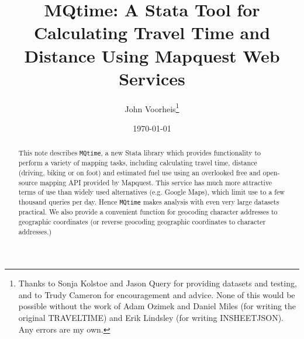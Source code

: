 \documentclass[12pt]{article}
\title{MQtime: A Stata Tool for Calculating Travel Time and Distance Using Mapquest Web Services}
\author{John Voorheis\thanks{Thanks to Sonja Kolstoe and Jason Query for providing datasets and testing, and to Trudy Cameron for encouragement and advice. None of this would be possible without the work of Adam Ozimek and Daniel Miles (for writing the original TRAVELTIME) and Erik Lindsley (for writing INSHEETJSON). Any errors are my own.}}
\affil{University of Oregon}
\date{\today}
\begin{document}
\maketitle

\begin{abstract}
This note describes  \verb|MQtime|, a new Stata library which provides functionality to perform a variety of mapping tasks, including calculating travel time, distance (driving, biking or on foot) and estimated fuel use using an overlooked free and open-source mapping API provided by Mapquest. This service has much more attractive terms of use than widely used alternatives (e.g. Google Maps), which limit use to a few thousand queries per day. Hence \verb|MQtime| makes analysis with even very large datasets practical. We also provide a convenient function for geocoding character addresses to geographic coordinates (or reverse geocoding geographic coordinates to character addresses.) 
\end{abstract}

\newpage
\end{document}
